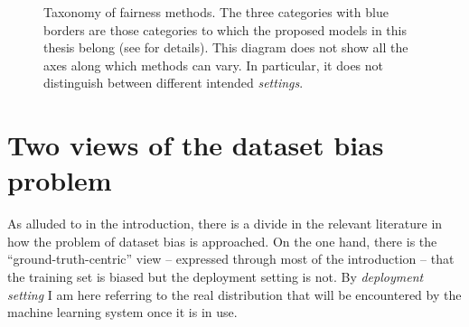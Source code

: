 %
\begin{figure}[tbp]
  \caption{%
    Taxonomy of fairness methods.
    The three categories with blue borders are those categories
    to which the proposed models in this thesis belong (see  for details).
    This diagram does not show all the axes along which methods can vary.
    In particular, it does not distinguish between different intended \emph{settings}.
  }%
  \label{fig:fairness-taxonomy}
\end{figure}%
%
\section{Two views of the dataset bias problem}\label{two-views-of-the-dataset-bias-problem}
As alluded to in the introduction,
there is a divide in the relevant literature in how the problem of dataset bias is approached.
On the one hand, there is the ``ground-truth-centric'' view -- expressed through most of the introduction --
that the training set is biased but the deployment setting is not.
By \emph{deployment setting} I am here referring to the real distribution
that will be encountered by the machine learning system once it is in use.

